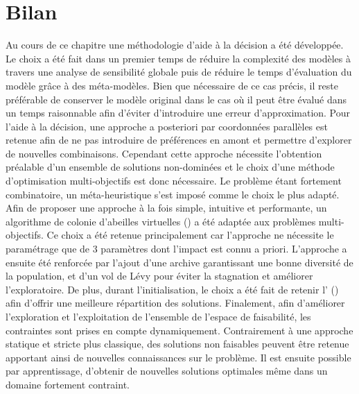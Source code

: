 \section{Bilan} %
\label{sec:bilan_methodologie}
Au cours de ce chapitre une méthodologie d’aide à la décision a été développée. Le choix a
été fait dans un premier temps de réduire la complexité des modèles à travers une analyse
de sensibilité globale puis de réduire le temps d’évaluation du modèle grâce à des
méta-modèles. Bien que nécessaire de ce cas précis, il reste préférable de conserver le modèle
original dans le cas où il peut être évalué dans un temps raisonnable afin d’éviter
d’introduire une erreur d’approximation. Pour l’aide à la décision, une approche a posteriori
par coordonnées parallèles est retenue afin de ne pas introduire de préférences en amont et permettre d’explorer
de nouvelles combinaisons. Cependant cette approche nécessite l’obtention préalable
d’un ensemble de solutions non-dominées et le choix d’une méthode d’optimisation
multi-objectifs est donc nécessaire. Le problème étant fortement combinatoire,
un méta-heuristique s’est imposé comme le choix le plus adapté. Afin de proposer
une approche à la fois simple, intuitive et performante,
un algorithme de colonie d’abeilles virtuelles () a été adaptée
aux problèmes multi-objectifs. Ce choix a été retenue principalement car l’approche
ne nécessite le paramétrage que de $3$ paramètres dont l’impact est connu a priori.
L’approche a ensuite été renforcée par l’ajout d’une
archive garantissant une bonne diversité de la population, et d’un vol de Lévy pour éviter
la stagnation et améliorer l’exploratoire. De plus, durant l’initialisation, le choix a été
fait de retenir l’ () afin d’offrir une meilleure
répartition des solutions. Finalement, afin d’améliorer l’exploration et l’exploitation
de l’ensemble de l’espace de faisabilité, les contraintes sont prises en compte
dynamiquement. Contrairement à une approche statique et stricte plus classique,
des solutions non faisables peuvent être retenue apportant ainsi de nouvelles
connaissances sur le problème. Il est ensuite possible par apprentissage, d’obtenir de nouvelles
solutions optimales même dans un domaine fortement contraint.

